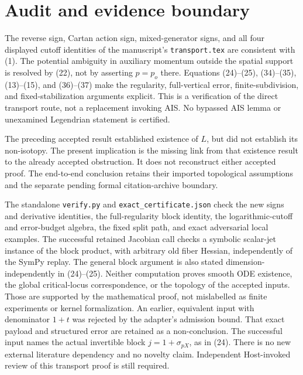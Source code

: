 \documentclass[11pt]{article}
\begin{document}
\section{Audit and evidence boundary}

The reverse sign, Cartan action sign, mixed-generator signs, and
all four displayed cutoff identities of the manuscript's
\texttt{transport.tex} are consistent with (1).
The potential ambiguity in auxiliary momentum outside the spatial
support is resolved by (22), not by asserting \(p=p_o\) there.
Equations (24)--(25), (34)--(35), (13)--(15), and (36)--(37)
make the regularity, full-vertical error, finite-subdivision, and
fixed-stabilization arguments explicit. This is a verification of
the direct transport route, not a replacement invoking AIS.
No bypassed AIS lemma or unexamined Legendrian statement is certified.

The preceding accepted result established existence of \(L\),
but did not establish its non-isotopy. The present implication
is the missing link from that existence result to the already
accepted obstruction. It does not reconstruct either accepted proof.
The end-to-end conclusion retains their imported topological
assumptions and the separate pending formal citation-archive boundary.

The standalone \texttt{verify.py} and \texttt{exact\_certificate.json}
check the new signs and derivative identities, the full-regularity
block identity, the logarithmic-cutoff and error-budget algebra,
the fixed split path, and exact adversarial local examples.
The successful retained Jacobian call checks a symbolic scalar-jet instance of
the block product, with arbitrary old fiber Hessian, independently
of the SymPy replay. The general block argument is also stated
dimension-independently in (24)--(25).
Neither computation proves smooth ODE existence, the global
critical-locus correspondence, or the topology of the accepted
inputs. Those are supported by the mathematical proof, not
mislabelled as finite experiments or kernel formalization.
An earlier, equivalent input with denominator \(1+t\) was rejected
by the adapter's admission bound. That exact payload and structured
error are retained as a non-conclusion. The successful input names
the actual invertible block \(j=1+\sigma_{pX}\), as in (24).
There is no new external literature dependency and no novelty claim.
Independent Host-invoked review of this transport proof is still required.
\end{document}
